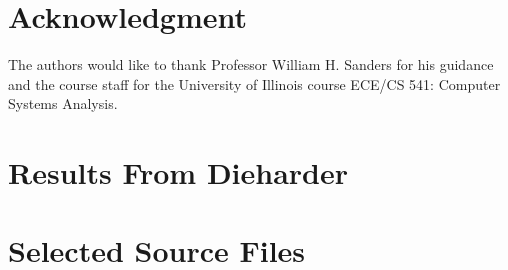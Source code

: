 \documentclass[conference,11pt]{IEEEtran}
\begin{document}
\section*{Acknowledgment}
The authors would like to thank Professor William H. Sanders for his guidance and the course staff for the University of Illinois course ECE/CS 541: Computer Systems Analysis.

\newpage
\onecolumn

\appendices

\renewcommand\thefigure{\thesection.\arabic{figure}}
\setcounter{figure}{0}

\section{Results From Dieharder}
\label{app:results}


\newpage

\section{Selected Source Files}
\label{app:source}


\newpage
\twocolumn



\end{document}
